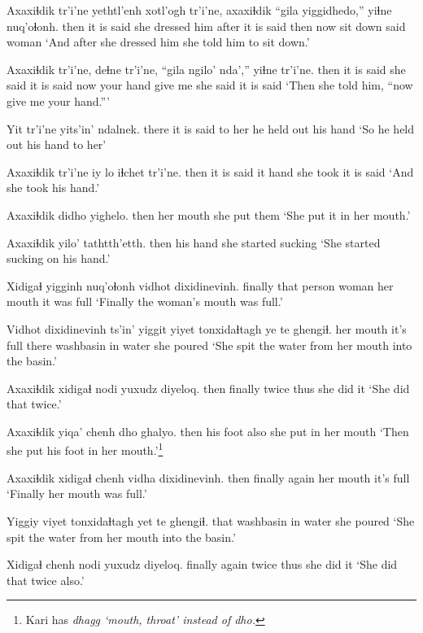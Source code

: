 \documentclass[12pt]{article}
\begin{document}
\gll Axaxiɬdik tr'i'ne yethtl'enh  xotl'ogh tr'i'ne, axaxiɬdik ``gila yiggidhedo,'' yiɬne nuq'oɬonh.
then  {it is said} {she dressed him} after  {it is said} then  now {sit down} said woman
\glt `And after she dressed him she told him to sit down.'
\glend

\gll Axaxiɬdik tr'i'ne, deɬne  tr'i'ne, ``gila ngilo'  nda','' yiɬne  tr'i'ne.
then  {it is said} {she said} {it is said}  now {your hand} {give me} {she said} {it is said}
\glt `Then she told him, ``now give me your hand.'''
\glend

\gll Yit tr'i'ne yits'in' ndalnek.
there {it is said} {to her} {he held out his hand}
\glt `So he held out his hand to her'
\glend

\gll Axaxiɬdik tr'i'ne iy lo  iɬchet  tr'i'ne.
then  {it is said} it hand {she took} {it is said}
\glt `And she took his hand.'
\glend

\gll Axaxiɬdik didho  yighelo.
then {her mouth} {she put them}
\glt `She put it in her mouth.'
\glend

\gll Axaxiɬdik yilo'  tathtth'etth.
then  {his hand} {she started sucking}
\glt `She started sucking on his hand.'
\glend

\gll Xidigaɬ yigginh nuq'oɬonh vidhot dixidinevinh.
finally {that person} woman  {her mouth} {it was full}
\glt `Finally the woman's mouth was full.'
\glend

\gll Vidhot dixidinevinh ts'in'  yiggit {yiyet tonxidaɬtagh} ye te ghengiɬ.
{her mouth} {it's full} {}  there washbasin   in water {she poured}
\glt `She spit the water from her mouth into the basin.'
\glend

\gll Axaxiɬdik xidigaɬ  nodi yuxudz  diyeloq.
then  finally  twice thus  {she did it}
\glt `She did that twice.'
\glend

\gll Axaxiɬdik yiqa'  chenh  {dho ghalyo.}
then  {his foot} also  {she put in her mouth}
\glt `Then she put his foot in her mouth.'\footnote{Kari has \em dhagg \em `mouth, throat' instead of \em dho.}
\glend

\gll Axaxiɬdik xidigaɬ chenh vidha  dixidinevinh.
then  finally  again {her mouth} {it's full}
\glt `Finally her mouth was full.'
\glend

\gll Yiggiy {viyet tonxidaɬtagh} yet te ghengiɬ.
that  washbasin   in water {she poured}
\glt `She spit the water from her mouth into the basin.'
\glend

\gll Xidigaɬ chenh nodi yuxudz diyeloq.
finally  again twice thus  {she did it}
\glt `She did that twice also.'
\glend
\end{document}
